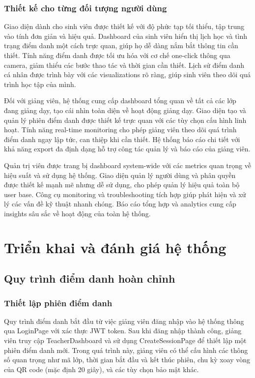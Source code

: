 \documentclass[12pt,a4paper]{report}
\begin{document}
\subsection{Thiết kế cho từng đối tượng người dùng}
Giao diện dành cho sinh viên được thiết kế với độ phức tạp tối thiểu, tập trung vào tính đơn giản và hiệu quả. Dashboard của sinh viên hiển thị lịch học và tình trạng điểm danh một cách trực quan, giúp họ dễ dàng nắm bắt thông tin cần thiết. Tính năng điểm danh được tối ưu hóa với cơ chế one-click thông qua camera, giảm thiểu các bước thao tác và thời gian cần thiết. Lịch sử điểm danh cá nhân được trình bày với các visualizations rõ ràng, giúp sinh viên theo dõi quá trình học tập của mình.

Đối với giảng viên, hệ thống cung cấp dashboard tổng quan về tất cả các lớp đang giảng dạy, tạo cái nhìn toàn diện về hoạt động giảng dạy. Giao diện tạo và quản lý phiên điểm danh được thiết kế trực quan với các tùy chọn cấu hình linh hoạt. Tính năng real-time monitoring cho phép giảng viên theo dõi quá trình điểm danh ngay lập tức, can thiệp khi cần thiết. Hệ thống báo cáo chi tiết với khả năng export đa định dạng hỗ trợ công tác quản lý và báo cáo của giảng viên.

Quản trị viên được trang bị dashboard system-wide với các metrics quan trọng về hiệu suất và sử dụng hệ thống. Giao diện quản lý người dùng và phân quyền được thiết kế mạnh mẽ nhưng dễ sử dụng, cho phép quản lý hiệu quả toàn bộ user base. Công cụ monitoring và troubleshooting tích hợp giúp phát hiện và xử lý các vấn đề kỹ thuật nhanh chóng. Báo cáo tổng hợp và analytics cung cấp insights sâu sắc về hoạt động của toàn hệ thống.

\chapter{Triển khai và đánh giá hệ thống}
\section{Quy trình điểm danh hoàn chỉnh}
\subsection{Thiết lập phiên điểm danh}
Quy trình điểm danh bắt đầu từ việc giảng viên đăng nhập vào hệ thống thông qua LoginPage với xác thực JWT token. Sau khi đăng nhập thành công, giảng viên truy cập TeacherDashboard và sử dụng CreateSessionPage để thiết lập một phiên điểm danh mới. Trong quá trình này, giảng viên có thể cấu hình các thông số quan trọng như mã lớp, thời gian bắt đầu và kết thúc phiên, chu kỳ xoay vòng của QR code (mặc định 20 giây), và các tùy chọn bảo mật khác.
\end{document}
